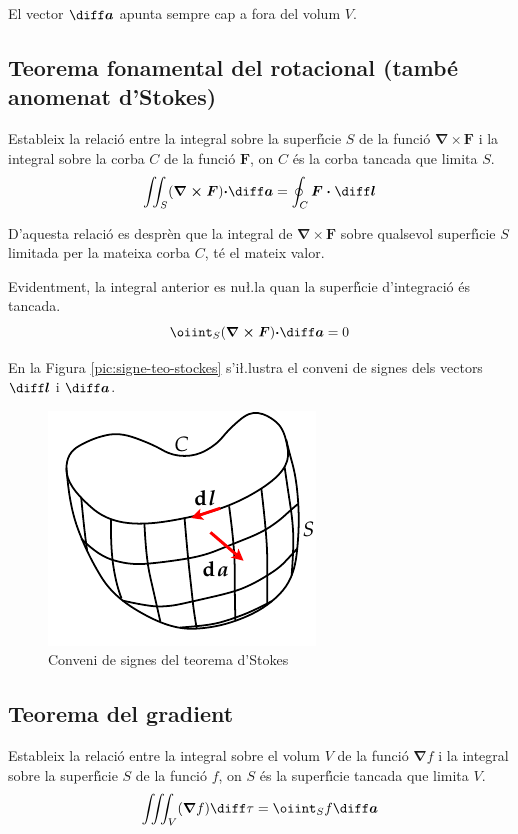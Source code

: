 \documentclass[catalan,a4paper,twoside,11pt]{article}
\begin{document}
El vector $\boldsymbol{\diff a}$ apunta sempre cap a fora del volum $V$.

\subsection{Teorema fonamental del rotacional (tamb\'{e} anomenat d'Stokes)}
Estableix la relaci\'{o} entre la integral sobre la superf\'{\i}cie $S$ de la funci\'{o} $\boldsymbol{\nabla\times F}$ i la integral sobre la corba $C$ de la funci\'{o} $\boldsymbol{F}$, on $C$ \'{e}s la corba tancada que limita $S$.
\begin{equation}
    \iint_S(\boldsymbol{\nabla\times F})\boldsymbol{\cdot\diff a} =
    \oint_C\boldsymbol{F\cdot\diff l}
\end{equation}

D'aquesta relaci\'{o} es despr\`{e}n que la integral de $\boldsymbol{\nabla\times F}$ sobre qualsevol superf\'{\i}cie $S$ limitada per la mateixa corba $C$, t\'{e} el mateix valor.

Evidentment, la integral anterior es nu{\l.l}a quan la superf\'{\i}cie d'integraci\'{o} \'{e}s tancada.
\begin{equation}
    \oiint_S(\boldsymbol{\nabla\times F})\boldsymbol{\cdot\diff a} = 0
\end{equation}

En la Figura \vref{pic:signe-teo-stockes} s'i{\l.l}ustra el conveni de
signes dels vectors $\boldsymbol{\diff l}$ i $\boldsymbol{\diff a}$.

\begin{figure}[h]
\centering
     \includegraphics{Imatges/Stokes.pdf}
\caption{Conveni de signes del teorema d'Stokes}
\label{pic:signe-teo-stockes}
\end{figure}


\subsection{Teorema del gradient}
Estableix la relaci\'{o} entre la integral sobre el volum $V$ de la funci\'{o} $\boldsymbol{\nabla}f$ i la integral sobre la superf\'{\i}cie $S$ de la funci\'{o} $f$, on $S$ \'{e}s la superf\'{\i}cie tancada que limita $V$.
\begin{equation}
    \iiint_V(\boldsymbol{\nabla}f)\diff \tau = \oiint_S f\boldsymbol{\diff a}
\end{equation}
\end{document}
